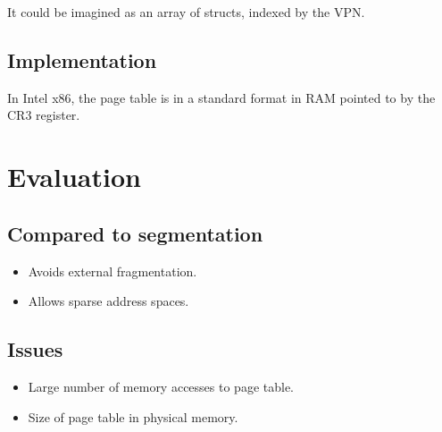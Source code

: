 It could be imagined as an array of structs, indexed by the VPN.

\subsection{Implementation}

In Intel x86, the page table is in a standard format in RAM pointed to by the CR3 register.

\section{Evaluation}

\subsection{Compared to segmentation}

\begin{itemize}
\item Avoids external fragmentation.
\item Allows sparse address spaces.
\end{itemize}

\subsection{Issues}

\begin{itemize}
\item Large number of memory accesses to page table.
\item Size of page table in physical memory.
\end{itemize}


